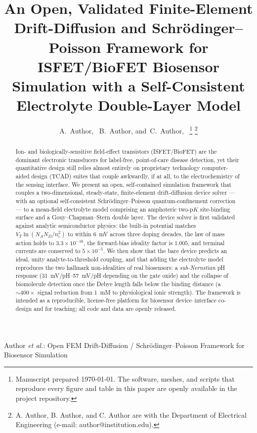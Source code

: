 \documentclass[10pt,journal]{IEEEtran}
\newcommand{\ee}[1]{\times 10^{#1}}
\begin{document}
\title{An Open, Validated Finite-Element Drift-Diffusion and
Schr\"odinger--Poisson Framework for ISFET/BioFET Biosensor Simulation with a
Self-Consistent Electrolyte Double-Layer Model}

\author{%
A.~Author,~
        B.~Author,
        and~C.~Author,~%
\thanks{Manuscript prepared \today. The software, meshes, and scripts that
reproduce every figure and table in this paper are openly available in the
project repository.}%
\thanks{A. Author, B. Author, and C. Author are with the Department of
Electrical Engineering (e-mail: author@institution.edu).}}

%
{Author \MakeLowercase{\textit{et al.}}: Open FEM Drift-Diffusion / Schr\"odinger--Poisson Framework for Biosensor Simulation}

\maketitle

\begin{abstract}
Ion- and biologically-sensitive field-effect transistors (ISFET/BioFET) are the
dominant electronic transducers for label-free, point-of-care disease detection,
yet their quantitative design still relies almost entirely on
proprietary technology computer-aided design (TCAD) suites that couple
awkwardly, if at all, to the electrochemistry of the sensing interface. We
present an open, self-contained simulation framework that couples a
two-dimensional, steady-state, finite-element drift-diffusion device solver ---
with an optional self-consistent Schr\"odinger--Poisson quantum-confinement
correction --- to a mean-field electrolyte model comprising an amphoteric
two-p$K$ site-binding surface and a Gouy--Chapman--Stern double layer. The device
solver is first validated against analytic semiconductor physics: the built-in
potential matches $V_T\ln(N_AN_D/n_i^2)$ to within \SI{6}{mV} across three doping
decades, the law of mass action holds to $3.3\ee{-16}$, the forward-bias ideality
factor is $1.005$, and terminal currents are conserved to $5\ee{-5}$. We then show
that the bare device predicts an ideal, unity analyte-to-threshold coupling, and
that adding the electrolyte model reproduces the two hallmark non-idealities of
real biosensors: a \emph{sub-Nernstian} pH response (\SIrange{31}{57}{mV/pH}
depending on the gate oxide) and the collapse of biomolecule detection once the
Debye length falls below the binding distance (a $\sim\!400\times$ signal
reduction from \SI{1}{mM} to physiological ionic strength). The framework is
intended as a reproducible, license-free platform for biosensor device--interface
co-design and for teaching; all code and data are openly released.
\end{abstract}
\end{document}
